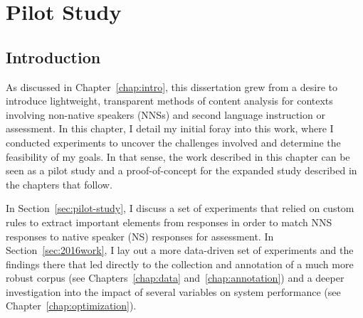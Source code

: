 \chapter{Pilot Study}
\label{chap:pilot}

\section{Introduction}
As discussed in Chapter~\ref{chap:intro}, this dissertation grew from a desire to introduce lightweight, transparent methods of content analysis for contexts involving non-native speakers (NNSs) and second language instruction or assessment. In this chapter, I detail my initial foray into this work, where I conducted experiments to uncover the challenges involved and determine the feasibility of my goals. In that sense, the work described in this chapter can be seen as a pilot study and a proof-of-concept for the expanded study described in the chapters that follow.

In Section~\ref{sec:pilot-study}, I discuss a set of experiments that relied on custom rules to extract important elements from responses in order to match NNS responses to native speaker (NS) responses for assessment. In Section~\ref{sec:2016work}, I lay out a more data-driven set of experiments and the findings there that led directly to the collection and annotation of a much more robust corpus (see Chapters~\ref{chap:data} and~\ref{chap:annotation}) and a deeper investigation into the impact of several variables on system performance (see Chapter~\ref{chap:optimization}).

%


